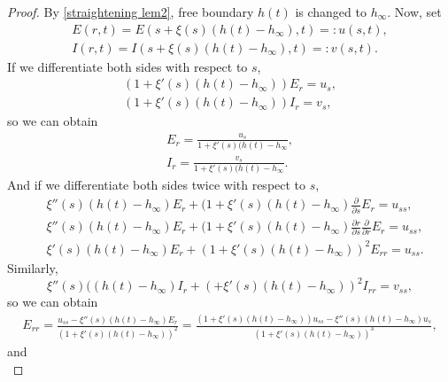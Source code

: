 \documentclass[10pt,a4paper]{amsart}
\begin{document}
\begin{proof}
By \cref{straightening lem2}, free boundary $h(t)$ is changed to $h_\infty$. Now, set 
\begin{equation*}
	\begin{aligned}
	E(r,t) = E(s+\xi(s)(h(t)-h_\infty),t)=:u(s,t),\\
	I(r,t) = I(s+\xi(s)(h(t)-h_\infty),t)=:v(s,t).
	\end{aligned}
\end{equation*}
If we differentiate both sides with respect to $s$,
\begin{equation*}
	\begin{aligned}
		(1+\xi'(s)(h(t)-h_\infty))E_r=u_s,\\
		(1+\xi'(s)(h(t)-h_\infty))I_r=v_s,
	\end{aligned}
\end{equation*}
so we can obtain
\begin{equation*}
	\begin{aligned}
		E_r = \frac{u_s}{1+\xi'(s)(h(t)-h_\infty},\\
		I_r = \frac{v_s}{1+\xi'(s)(h(t)-h_\infty}.
	\end{aligned}
\end{equation*}
And if we differentiate both sides twice with respect to $s$,
\begin{equation*}
	\begin{aligned}
		&\xi''(s)(h(t)-h_\infty)E_r+(1+\xi'(s)(h(t)-h_\infty)\frac{\partial}{\partial s}E_r=u_{ss},\\
		&\xi''(s)(h(t)-h_\infty)E_r+(1+\xi'(s)(h(t)-h_\infty)\frac{\partial r}{\partial s}\frac{\partial}{\partial r}E_r=u_{ss},\\
		&\xi'(s)(h(t)-h_\infty)E_r+(1+\xi'(s)(h(t)-h_\infty))^2E_{rr}=u_{ss}.
	\end{aligned}
\end{equation*}
Similarly,
\begin{equation*}
	\xi''(s)((h(t)-h_\infty)I_r+(+\xi'(s)(h(t)-h_\infty))^2I_{rr}=v_{ss},
\end{equation*}
so we can obtain
\begin{equation*}
	\begin{aligned}
		E_{rr}=\frac{u_{ss}-\xi''(s)(h(t)-h_\infty)E_r}{(1+\xi'(s)(h(t)-h_\infty))^2}=\frac{(1+\xi'(s)(h(t)-h_\infty))u_{ss}-\xi''(s)(h(t)-h_\infty)u_s}{(1+\xi'(s)(h(t)-h_\infty))^3},
	\end{aligned}
\end{equation*}
and 
\begin{equation*}

\end{equation*}
\end{proof}
\end{document}
